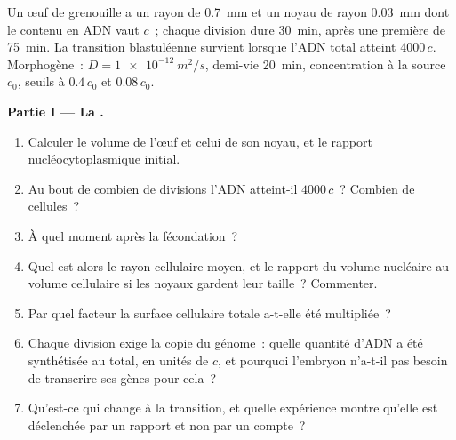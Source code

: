 \begin{problem}
\label{pb:b2:vertebrate-development:1}
Un œuf de grenouille a un rayon de \qty{0.7}{mm} et un noyau de rayon
\qty{0.03}{mm} dont le contenu en ADN vaut $c$~; chaque division dure
\qty{30}{min}, après une première de \qty{75}{min}. La transition
blastuléenne survient lorsque l'ADN total atteint $4000\,c$.
Morphogène~: $D =
\qty{1e-12}{m^2/s}$, demi-vie \qty{20}{min}, concentration à la source
$c_0$, seuils à $0.4\,c_0$ et $0.08\,c_0$.

\medskip
\noindent\textbf{Partie I --- La .}
\begin{enumerate}
  \item Calculer le volume de l'œuf et celui de son noyau, et le rapport
        nucléocytoplasmique initial.
  \item Au bout de combien de divisions l'ADN atteint-il $4000\,c$~?
        Combien de cellules~?
  \item À quel moment après la fécondation~?
  \item Quel est alors le rayon cellulaire moyen, et le rapport du volume
        nucléaire au volume cellulaire si les noyaux gardent leur
        taille~? Commenter.
  \item Par quel facteur la surface cellulaire totale a-t-elle été
        multipliée~?
  \item Chaque division exige la copie du génome~: quelle quantité d'ADN
        a été synthétisée au total, en unités de $c$, et pourquoi
        l'embryon n'a-t-il pas besoin de transcrire ses gènes pour
        cela~?
  \item Qu'est-ce qui change à la transition, et quelle expérience
        montre qu'elle est déclenchée par un rapport et non par un
        compte~?
\end{enumerate}


\end{problem}
